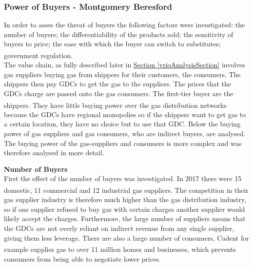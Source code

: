 \documentclass[11pt]{article}		%
\newcommand{\supercite}[1]{\textsuperscript{\cite{#1}}}		%
\newcommand{\sectref}[1]{\hyperref[#1]{Section \ref*{#1}}}     %
\begin{document}
		
		\subsubsection[Power of Buyers]{Power of Buyers - Montgomery Beresford}
		
		        In order to asses the threat of buyers the following factors were investigated: the number of buyers; the differentiability of the products sold; the sensitivity of buyers to price; the ease with which the buyer can switch to substitutes; government regulation.\supercite{Barney}
		        \\ 
		        \hspace*{3ex}The value chain, as fully described later in \sectref{vrioAnalysisSection} involves gas suppliers buying gas from shippers for their customers, the consumers. The shippers then pay GDCs to get the gas to the suppliers. The prices that the GDCs charge are passed onto the gas consumers. The first-tier buyer are the shippers.\supercite{ofgem2020nic} They have little buying power over the gas distribution networks because the GDCs have regional monopolies so if the shippers want to get gas to a certain location, they have no choice but to use that GDC. Below the buying power of gas suppliers and gas consumers, who are indirect buyers, are analysed. The buying power of the gas-suppliers and consumers is more complex and was therefore analysed in more detail.
                
                \textbf{Number of Buyers}
                \\
                First the effect of the number of buyers was investigated. In 2017 there were 15 domestic, 11 commercial and 12 industrial gas suppliers.\supercite{competition_in_gas_supply} The competition in their gas supplier industry is therefore much higher than the gas distribution industry, so if one supplier refused to buy gas with certain charges another supplier would likely accept the charges. Furthermore, the large number of suppliers means that the GDCs are not overly reliant on indirect revenue from any single supplier, giving them less leverage. There are also a large number of consumers, Cadent for example supplies gas to over 11 million homes and businesses\supercite{Cadent_Plan}, which prevents consumers from being able to negotiate lower prices.
                
\end{document}
